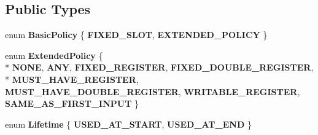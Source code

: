 \subsection*{Public Types}
\begin{DoxyCompactItemize}
\item 
\hypertarget{classv8_1_1internal_1_1_l_unallocated_a5c4527b1ada3e5fc5af7ae028910cf65}{}enum {\bfseries Basic\+Policy} \{ {\bfseries F\+I\+X\+E\+D\+\_\+\+S\+L\+O\+T}, 
{\bfseries E\+X\+T\+E\+N\+D\+E\+D\+\_\+\+P\+O\+L\+I\+C\+Y}
 \}\label{classv8_1_1internal_1_1_l_unallocated_a5c4527b1ada3e5fc5af7ae028910cf65}

\item 
\hypertarget{classv8_1_1internal_1_1_l_unallocated_a7f9fb8ddaf57075386c66517aea3fe9c}{}enum {\bfseries Extended\+Policy} \{ \\*
{\bfseries N\+O\+N\+E}, 
{\bfseries A\+N\+Y}, 
{\bfseries F\+I\+X\+E\+D\+\_\+\+R\+E\+G\+I\+S\+T\+E\+R}, 
{\bfseries F\+I\+X\+E\+D\+\_\+\+D\+O\+U\+B\+L\+E\+\_\+\+R\+E\+G\+I\+S\+T\+E\+R}, 
\\*
{\bfseries M\+U\+S\+T\+\_\+\+H\+A\+V\+E\+\_\+\+R\+E\+G\+I\+S\+T\+E\+R}, 
{\bfseries M\+U\+S\+T\+\_\+\+H\+A\+V\+E\+\_\+\+D\+O\+U\+B\+L\+E\+\_\+\+R\+E\+G\+I\+S\+T\+E\+R}, 
{\bfseries W\+R\+I\+T\+A\+B\+L\+E\+\_\+\+R\+E\+G\+I\+S\+T\+E\+R}, 
{\bfseries S\+A\+M\+E\+\_\+\+A\+S\+\_\+\+F\+I\+R\+S\+T\+\_\+\+I\+N\+P\+U\+T}
 \}\label{classv8_1_1internal_1_1_l_unallocated_a7f9fb8ddaf57075386c66517aea3fe9c}

\item 
\hypertarget{classv8_1_1internal_1_1_l_unallocated_aa0d9c1e73ec74836224460b8693072cd}{}enum {\bfseries Lifetime} \{ {\bfseries U\+S\+E\+D\+\_\+\+A\+T\+\_\+\+S\+T\+A\+R\+T}, 
{\bfseries U\+S\+E\+D\+\_\+\+A\+T\+\_\+\+E\+N\+D}
 \}\label{classv8_1_1internal_1_1_l_unallocated_aa0d9c1e73ec74836224460b8693072cd}

\end{DoxyCompactItemize}
